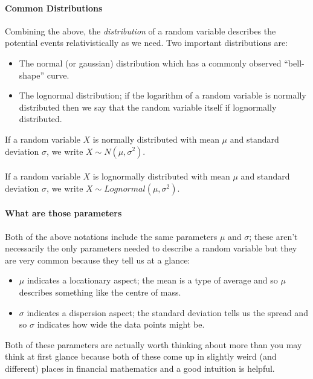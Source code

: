 \documentclass[../../Axiomathic.tex]{subfiles}
\begin{document}
\paragraph{Common Distributions}
Combining the above, the \textit{distribution} of a random variable describes the potential events relativistically as we need. Two important distributions are:
\begin{itemize}
\item The normal (or gaussian) distribution which has a commonly observed ``bell-shape'' curve.
\item The lognormal distribution; if the logarithm of a random variable is normally distributed then we say that the random variable itself if lognormally distributed. 
\end{itemize}
\begin{nota}
If a random variable $X$ is normally distributed with mean $\mu$ and standard deviation $\sigma$, we write $X \sim N(\mu,\sigma^2)$.\\
\\
If a random variable $X$ is lognormally distributed with mean $\mu$ and standard deviation $\sigma$, we write $X \sim Lognormal(\mu,\sigma^2)$.
\end{nota}
\paragraph{What are those parameters}
Both of the above notations include the same parameters $\mu$ and $\sigma$; these aren't necessarily the only parameters needed to describe a random variable but they are very common because they tell us at a glance:
\begin{itemize}
\item $\mu$ indicates a locationary aspect; the mean is a type of average and so $\mu$ describes something like the centre of mass. 
\item $\sigma$ indicates a dispersion aspect; the standard deviation tells us the spread and so $\sigma$ indicates how wide the data points might be. 
\end{itemize}
\begin{remark}
Both of these parameters are actually worth thinking about more than you may think at first glance because both of these come up in slightly weird (and different) places in financial mathematics and a good intuition is helpful.
\end{remark}
\end{document}

